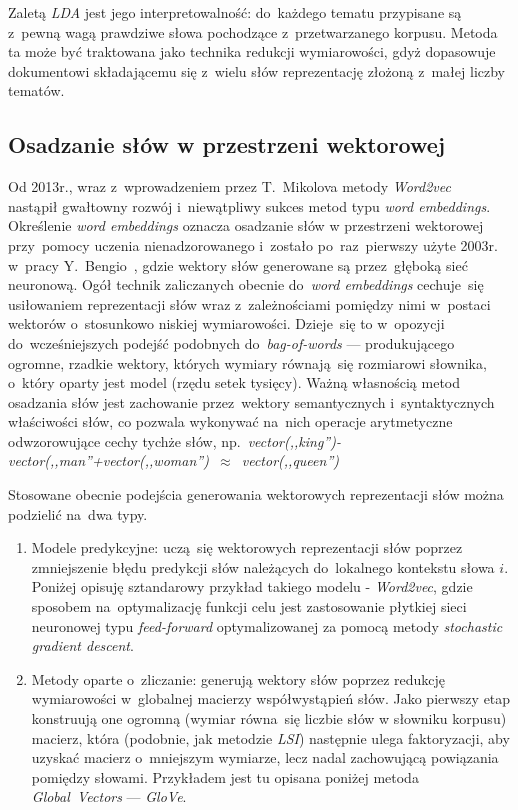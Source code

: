 \documentclass[pl]{minipw} %
\begin{document}
Zaletą \textit{LDA} jest jego interpretowalność: do~każdego tematu przypisane są z~pewną wagą prawdziwe słowa pochodzące z~przetwarzanego korpusu. Metoda ta może być traktowana jako technika redukcji wymiarowości, gdyż dopasowuje dokumentowi składającemu się z~wielu słów reprezentację złożoną z~małej liczby tematów.


\subsection{Osadzanie słów w przestrzeni wektorowej}
Od 2013r., wraz z~wprowadzeniem przez T.~Mikolova metody \textit{Word2vec}~\cite{word2vec} nastąpił gwałtowny rozwój i~niewątpliwy sukces metod typu \textit{word embeddings}. Określenie \textit{word embeddings} oznacza osadzanie słów w przestrzeni wektorowej przy~pomocy uczenia nienadzorowanego i~zostało po~raz~pierwszy użyte 2003r. w~pracy Y.~Bengio~\cite{bengio}, gdzie wektory słów generowane są przez~głęboką sieć neuronową. Ogół technik zaliczanych obecnie do~\textit{word embeddings} cechuje~się usiłowaniem reprezentacji słów wraz z~zależnościami pomiędzy nimi w~postaci wektorów o~stosunkowo niskiej wymiarowości. Dzieje~się to w~opozycji do~wcześniejszych podejść podobnych do~\textit{bag-of-words} --- produkującego ogromne, rzadkie wektory, których wymiary równają~się rozmiarowi słownika, o~który oparty jest model (rzędu setek tysięcy). Ważną własnością metod osadzania słów jest zachowanie przez~wektory semantycznych i~syntaktycznych właściwości słów, co pozwala wykonywać na~nich operacje arytmetyczne odwzorowujące cechy tychże słów, np.~\textit{vector(,,king'')-vector(,,man''+vector(,,woman'')~$\approx$~vector(,,queen'')} 

Stosowane obecnie podejścia generowania wektorowych reprezentacji słów można podzielić na~dwa typy.
\begin{enumerate}
	\item Modele predykcyjne: uczą~się wektorowych reprezentacji słów poprzez zmniejszenie błędu predykcji słów należących do~lokalnego kontekstu słowa $i$. Poniżej opisuję sztandarowy przykład takiego modelu - \textit{Word2vec}, gdzie sposobem na~optymalizację funkcji celu jest zastosowanie płytkiej sieci neuronowej typu \textit{feed-forward} optymalizowanej za pomocą metody \textit{stochastic gradient descent}.
	\item Metody oparte o~zliczanie: generują wektory słów poprzez redukcję wymiarowości w~globalnej macierzy współwystąpień słów.
	Jako pierwszy etap konstruują one ogromną (wymiar równa~się liczbie słów w słowniku korpusu) macierz, która (podobnie, jak  metodzie \textit{LSI}) następnie ulega faktoryzacji, aby uzyskać macierz o~mniejszym wymiarze, lecz nadal zachowującą powiązania pomiędzy słowami. Przykładem jest tu opisana poniżej metoda \textit{Global~Vectors} --- \textit{GloVe}.
\end{enumerate}
\end{document}
